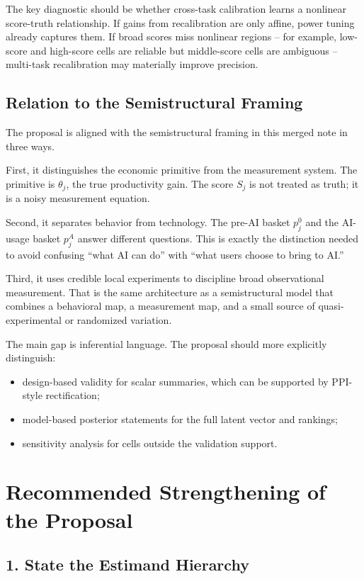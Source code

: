 \documentclass[11pt]{article}
\begin{document}
The key diagnostic should be whether cross-task calibration learns a nonlinear score-truth relationship. If gains from recalibration are only affine, power tuning already captures them. If broad scores miss nonlinear regions -- for example, low-score and high-score cells are reliable but middle-score cells are ambiguous -- multi-task recalibration may materially improve precision.

\subsection{Relation to the Semistructural Framing}

The proposal is aligned with the semistructural framing in this merged note in three ways.

First, it distinguishes the economic primitive from the measurement system. The primitive is $\theta_j$, the true productivity gain. The score $S_j$ is not treated as truth; it is a noisy measurement equation.

Second, it separates behavior from technology. The pre-AI basket $p^0_j$ and the AI-usage basket $p^A_j$ answer different questions. This is exactly the distinction needed to avoid confusing ``what AI can do'' with ``what users choose to bring to AI.''

Third, it uses credible local experiments to discipline broad observational measurement. That is the same architecture as a semistructural model that combines a behavioral map, a measurement map, and a small source of quasi-experimental or randomized variation.

The main gap is inferential language. The proposal should more explicitly distinguish:
\begin{itemize}[leftmargin=*]
  \item design-based validity for scalar summaries, which can be supported by PPI-style rectification;
  \item model-based posterior statements for the full latent vector and rankings;
  \item sensitivity analysis for cells outside the validation support.
\end{itemize}

\section{Recommended Strengthening of the Proposal}

\subsection{1. State the Estimand Hierarchy}
\end{document}
